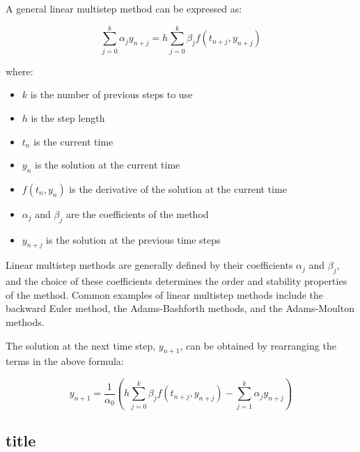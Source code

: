 A general linear multistep method can be expressed as:

\[
\sum_{j=0}^{k} \alpha_j y_{n+j} = h \sum_{j=0}^{k} \beta_j f(t_{n+j}, y_{n+j})
\]

where:


\begin{itemize}
  \item \(k\) is the number of previous steps to use
  \item \(h\) is the step length
  \item \(t_n\) is the current time
  \item \(y_n\) is the solution at the current time
  \item \(f(t_n, y_n)\) is the derivative of the solution at the current time
  \item \(\alpha_j\) and \(\beta_j\) are the coefficients of the method
  \item \(y_{n+j}\) is the solution at the previous time steps
\end{itemize}


Linear multistep methods are generally defined by their coefficients \(\alpha_j\) and \(\beta_j\), and the choice of these coefficients determines the order and stability properties of the method. Common examples of linear multistep methods include the backward Euler method, the Adams-Bashforth methods, and the Adams-Moulton methods.

The solution at the next time step, \(y_{n+1}\), can be obtained by rearranging the terms in the above formula:

\[
y_{n+1} = \frac{1}{\alpha_0} \left(h \sum_{j=0}^{k} \beta_j f(t_{n+j}, y_{n+j}) - \sum_{j=1}^{k} \alpha_j y_{n+j}\right)
\]



\subsection*{title}




